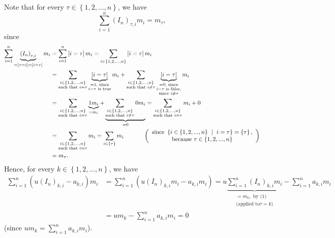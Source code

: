 \documentclass[12pt,final,notitlepage,onecolumn]{article}%
\begin{document}
Note that for every $\tau\in\left\{  1,2,...,n\right\}  $, we have%
\begin{equation}
\sum\limits_{i=1}^{n}\left(  I_{n}\right)  _{\tau,i}m_{i}=m_{\tau}, \label{1}%
\end{equation}
since%
\begin{align*}
\sum\limits_{i=1}^{n}\underbrace{\left(  I_{n}\right)  _{\tau,i}}_{=\left[
\tau=i\right]  =\left[  i=\tau\right]  }m_{i}  &  =\sum\limits_{i=1}%
^{n}\left[  i=\tau\right]  m_{i}=\sum\limits_{i\in\left\{  1,2,...,n\right\}
}\left[  i=\tau\right]  m_{i}\\
&  =\sum\limits_{\substack{i\in\left\{  1,2,...,n\right\}  \\\text{such that
}i=\tau}}\underbrace{\left[  i=\tau\right]  }_{\substack{=1\text{,
since}\\i=\tau\text{ is true}}}m_{i}+\sum\limits_{\substack{i\in\left\{
1,2,...,n\right\}  \\\text{such that }i\neq\tau}}\underbrace{\left[
i=\tau\right]  }_{\substack{=0\text{, since}\\i=\tau\text{ is false,}%
\\\text{since }i\neq\tau}}m_{i}\\
&  =\sum\limits_{\substack{i\in\left\{  1,2,...,n\right\}  \\\text{such that
}i=\tau}}\underbrace{1m_{i}}_{=m_{i}}+\underbrace{\sum\limits_{\substack{i\in
\left\{  1,2,...,n\right\}  \\\text{such that }i\neq\tau}}0m_{i}}_{=0}%
=\sum\limits_{\substack{i\in\left\{  1,2,...,n\right\}  \\\text{such that
}i=\tau}}m_{i}+0\\
&  =\sum\limits_{\substack{i\in\left\{  1,2,...,n\right\}  \\\text{such that
}i=\tau}}m_{i}=\sum\limits_{i\in\left\{  \tau\right\}  }m_{i}%
\ \ \ \ \ \ \ \ \ \ \left(
\begin{array}
[c]{c}%
\text{since }\left\{  i\in\left\{  1,2,...,n\right\}  \ \mid\ i=\tau\right\}
=\left\{  \tau\right\}  ,\\
\text{because }\tau\in\left\{  1,2,...,n\right\}
\end{array}
\right) \\
&  =m_{\tau}.
\end{align*}
Hence, for every $k\in\left\{  1,2,...,n\right\}  $, we have%
\begin{align*}
\sum\limits_{i=1}^{n}\left(  u\left(  I_{n}\right)  _{k,i}-a_{k,i}\right)
m_{i}  &  =\sum\limits_{i=1}^{n}\left(  u\left(  I_{n}\right)  _{k,i}%
m_{i}-a_{k,i}m_{i}\right)  =u\underbrace{\sum\limits_{i=1}^{n}\left(
I_{n}\right)  _{k,i}m_{i}}_{\substack{=m_{k},\text{ by (1)}\\\text{(applied to
}\tau=k\text{)}}}-\sum\limits_{i=1}^{n}a_{k,i}m_{i}\\
&  =um_{k}-\sum\limits_{i=1}^{n}a_{k,i}m_{i}=0
\end{align*}
(since $um_{k}=\sum\limits_{i=1}^{n}a_{k,i}m_{i}$).
\end{document}
